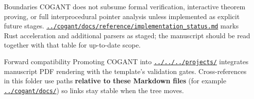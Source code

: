 \documentclass[
  ignorenonframetext,
]{beamer}
\begin{document}
\begin{frame}[fragile]{Boundaries}
\protect{}\label{boundaries}
COGANT does not subsume formal verification, interactive theorem
proving, or full interprocedural pointer analysis unless implemented as
explicit future stages.
\href{../cogant/docs/reference/implementation_status.md}{\texttt{../cogant/docs/reference/implementation\_status.md}}
marks Rust acceleration and additional parsers as staged; the manuscript
should be read together with that table for up-to-date scope.
\end{frame}

\begin{frame}[fragile]{Forward compatibility}
\protect{}\label{forward-compatibility}
Promoting COGANT into
\href{../../../projects/}{\texttt{../../../projects/}} integrates
manuscript PDF rendering with the template's validation gates.
Cross-references in this folder use paths \textbf{relative to these
Markdown files} (for example
\href{../cogant/docs/}{\texttt{../cogant/docs/}}) so links stay stable
when the tree moves.
\end{frame}
\end{document}
